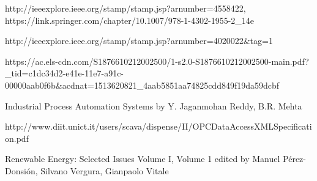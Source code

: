 \documentclass[twosided,a4,10pt]{article}
\begin{document}
\begin{multicols}{2}

 
 

 
 


http://ieeexplore.ieee.org/stamp/stamp.jsp?arnumber=4558422,
https://link.springer.com/chapter/10.1007/978-1-4302-1955-2\_14e

http://ieeexplore.ieee.org/stamp/stamp.jsp?arnumber=4020022\&tag=1 \newline

https://ac.els-cdn.com/S1876610212002500/1-s2.0-S1876610212002500-main.pdf?\_tid=c1dc34d2-e41e-11e7-a91c-00000aab0f6b\&acdnat=1513620821\_4aab5851aa74825cdd849f19da59dcbf 
\newline

Industrial Process Automation Systems by Y. Jaganmohan Reddy, B.R. Mehta
\newline

http://www.diit.unict.it/users/scava/dispense/II/OPCDataAccessXMLSpecification.pdf
\newline

Renewable Energy: Selected Issues Volume I, Volume 1
edited by Manuel Pérez-Donsión, Silvano Vergura, Gianpaolo Vitale
\end{multicols}
\end{document}
